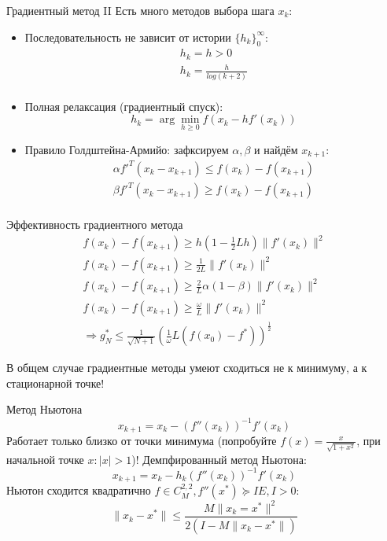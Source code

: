 \documentclass[14pt, fleqn, xcolor={dvipsnames, table}]{beamer}
\begin{document}
\begin{frame}{Градиентный метод II}
\small
Есть много методов выбора шага $x_k$:
\begin{itemize}
  \item Последовательность не зависит от истории $\{h_k\}_{0}^{\infty}$:
  $$\begin{array}{l}
  h_k = h > 0 \\
  h_k = \frac{h}{log(k+2)} \\
  \end{array}$$
  \item Полная релаксация (градиентный спуск):
  $$
  h_k = \arg\min_{h \ge 0} f (x_k - hf'(x_k))
  $$
  \item Правило Голдштейна-Армийо: зафксируем $\alpha, \beta$ и найдём $x_{k+1}$:
  $$\begin{array}{l}
  \alpha f'^T(x_k - x_{k+1}) \le f(x_k) - f(x_{k+1}) \\
  \beta f'^T(x_k - x_{k+1}) \ge f(x_k) - f(x_{k+1}) \\
  \end{array}$$
\end{itemize}

\end{frame}


\begin{frame}{Эффективность градиентного метода}
$$\begin{array}{l}
  f(x_k) - f(x_{k+1}) \ge h(1 - \frac{1}{2}Lh)\|f'(x_k)\|^2 \\
  f(x_k) - f(x_{k+1}) \ge \frac{1}{2L}\|f'(x_k)\|^2 \\
  f(x_k) - f(x_{k+1}) \ge \frac{2}{L}\alpha (1 - \beta) \|f'(x_k)\|^2 \\
  f(x_k) - f(x_{k+1}) \ge \frac{\omega}{L}\|f'(x_k)\|^2 \\
  \Rightarrow g_{N}^{*} \le \frac{1}{\sqrt{N+1}} (\frac{1}{\omega}L(f(x_0) - f^*))^{\frac{1}{2}}
\end{array}$$

В общем случае градиентные методы умеют сходиться не к минимуму, а к стационарной точке!
\end{frame}


\begin{frame}{Метод Ньютона}
\small
$$
  x_{k+1} = x_k - (f''(x_k))^{-1}f'(x_k)
$$
Работает только близко от точки минимума (попробуйте $f(x) = \frac{x}{\sqrt{1 + x^2}}$, при начальной точке $x : |x| > 1$)!
Демпфированный метод Ньютона:
$$
  x_{k+1} = x_k - h_k(f''(x_k))^{-1}f'(x_k)
$$
Ньютон сходится квадратично $f \in C_{M}^{2,2}, f''(x^*) \succeq I E, I > 0$:
$$
  \|x_k - x^*\| \le \frac{M\|x_k = x^*\|^2}{2(I - M\|x_k - x^*\|)}
$$

\end{frame}
\end{document}
